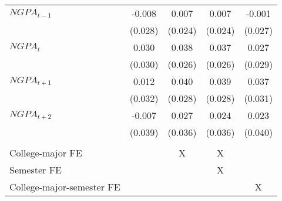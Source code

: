 {{\begin{tabular}{lccc|>{\columncolor[gray]{0.8}}c}
\hspace{3mm}$NGPA_{t-1}$            &      -0.008   &       0.007   &       0.007   &      -0.001   \\
                    &     (0.028)   &     (0.024)   &     (0.024)   &     (0.027)   \\
 
\hspace{3mm}$NGPA_{t}$              &       0.030   &       0.038   &       0.037   &       0.027   \\
                    &     (0.030)   &     (0.026)   &     (0.026)   &     (0.029)   \\
 
\hspace{3mm}$NGPA_{t+1}$            &       0.012   &       0.040   &       0.039   &       0.037   \\
                    &     (0.032)   &     (0.028)   &     (0.028)   &     (0.031)   \\
 
\hspace{3mm}$NGPA_{t+2}$            &      -0.007   &       0.027   &       0.024   &       0.023   \\
                    &     (0.039)   &     (0.036)   &     (0.036)   &     (0.040)   \\
&  &  &  &   \\  \hline 
 College-major FE                       &  & X   & X &   \\
 Semester FE                            &  &     & X &   \\
 College-major-semester FE              &  &     &   & X \\

\bottomrule
\end{tabular}
}
}
